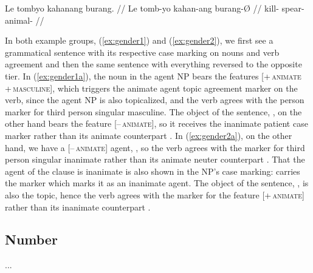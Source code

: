 \a\label{ex:gender2b}\begingl
	\gla *Le tombyo kahanang burang. //
	\glb *Le tomb-yo kahan-ang burang-Ø //
	\glc *\PatTI{} kill-\TsgN{} spear-\AargI{} animal-\Top{} //
\endgl
\xe

In both example groups, (\ref{ex:gender1}) and (\ref{ex:gender2}), we first see 
a grammatical sentence with its respective case marking on nouns and verb 
agreement and then the same sentence with everything reversed to the opposite 
tier. In (\ref{ex:gender1a}), the noun in the agent NP 
 bears the features 
\textsc{[+\,animate +\,masculine]}, which triggers the animate agent topic 
agreement marker  on the verb, since the agent NP is also 
topicalized, and the verb agrees with the person marker  
for third person singular masculine. The object of the sentence, 
, on the other hand bears the feature 
\textsc{[–\,animate]}, so it receives the inanimate patient case marker 
 rather than its animate counterpart . In 
(\ref{ex:gender2a}), on the other hand, we have a \textsc{[–\,animate]} agent, 
, so the verb agrees with the marker  
for third person singular inanimate rather than its animate 
neuter counterpart . That the agent of the clause is inanimate 
is also shown in the NP's case marking:  carries the marker 
 which marks it as an inanimate agent. The object of the 
sentence, , is also the topic, hence the verb 
agrees with the marker  for the feature \textsc{[+\,animate]} 
rather than its inanimate counterpart .


\subsection{Number}

...



